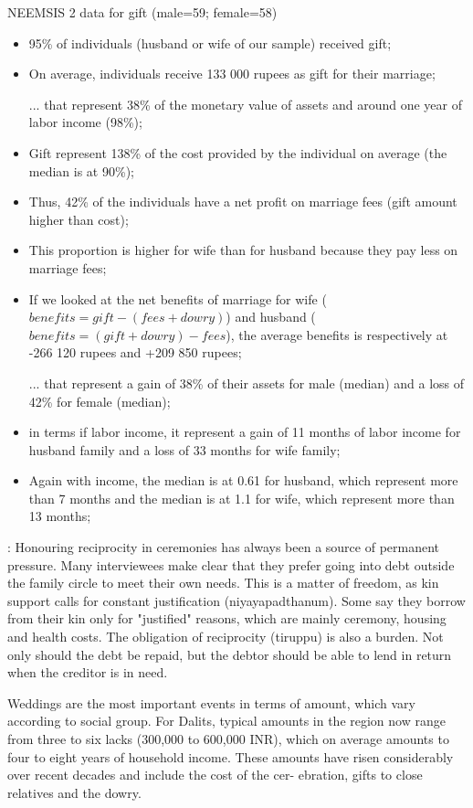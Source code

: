 \documentclass[a4paper, 11pt, onecolumn]{article}
\begin{document}
NEEMSIS 2 data for gift (male=59; female=58)
\begin{itemize}[leftmargin=*]
\item 95\% of individuals (husband or wife of our sample) received gift; 
\item On average, individuals receive 133 000 rupees as gift for their marriage;
\item [...] that represent 38\% of the monetary value of assets and around one year of labor income (98\%);
\item Gift represent 138\% of the cost provided by the individual on average (the median is at 90\%);
\item Thus, 42\% of the individuals have a net profit on marriage fees (gift amount higher than cost);
\item This proportion is higher for wife than for husband because they pay less on marriage fees;
\item If we looked at the net benefits of marriage for wife ($benefits=gift-(fees+dowry)$) and husband ($benefits=(gift+dowry)-fees$), the average benefits is respectively at -266 120 rupees and +209 850 rupees;
\item [...] that represent a gain of 38\% of their assets for male (median) and a loss of 42\% for female (median);
\item in terms if labor income, it represent a gain of 11 months of labor income for husband family and a loss of 33 months for wife family;
\item Again with income, the median is at 0.61 for husband, which represent more than 7 months and the median is at 1.1 for wife, which represent more than 13 months;
\end{itemize}



\cite{Guerin2014a} : Honouring reciprocity in ceremonies has always been a source of permanent pressure.
Many interviewees make clear that they prefer going into debt outside the family circle
to meet their own needs. This is a matter of freedom, as kin support calls for constant
justification (niyayapadthanum). Some say they borrow from their kin only for
"justified" reasons, which are mainly ceremony, housing and health costs. The
obligation of reciprocity (tiruppu) is also a burden. Not only should the debt be repaid,
but the debtor should be able to lend in return when the creditor is in need. 



\cite{Guerin2020c} Weddings are the most important events in terms of amount,
which vary according to social group. For Dalits, typical amounts in the region now range from three
to six lacks (300,000 to 600,000 INR), which on average amounts to four to eight years of household
income. These amounts have risen considerably over recent decades and include the cost of the cer-
ebration, gifts to close relatives and the dowry.
\end{document}
